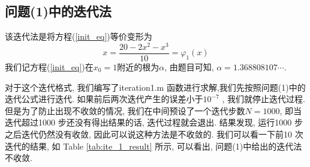 \documentclass[a4paper]{article}
\begin{document}
\begin{CJK*}{GBK}{song}
\subsection{问题(1)中的迭代法}
该迭代法是将方程(\ref{init_eq})等价变形为
\begin{equation}\label{iter_1}
x=\frac{20-2x^2-x^3}{10}=\varphi_1(x)
\end{equation}
我们记方程(\ref{init_eq})在$x_0=1$附近的根为$\alpha$, 由题目可知, $\alpha=1.368808107\cdots$.\par
对于这个迭代格式, 我们编写了iteration1.m 函数进行求解,我们先按照问题(1)中的迭代公式进行迭代. 如果前后两次迭代产生的误差小于$10^{-7}$ , 我们就停止迭代过程. 但是为了防止出现不收敛的情况, 我们在中间预设了一个迭代步数$N=1000$, 即当迭代超过1000 步还没有得出结果的话, 迭代过程就会退出. 结果发现, 运行1000 步之后迭代仍然没有收敛, 因此可以说这种方法是不收敛的. 我们可以看一下前10 次迭代的结果, 如 Table \ref{tab:ite_1_result} 所示, 可以看出, 问题(1)中给出的迭代法不收敛.
\begin{center}
\begin{table*}[!htbp]
%
\end{table*}
\end{center}



\end{CJK*}
\end{document}
